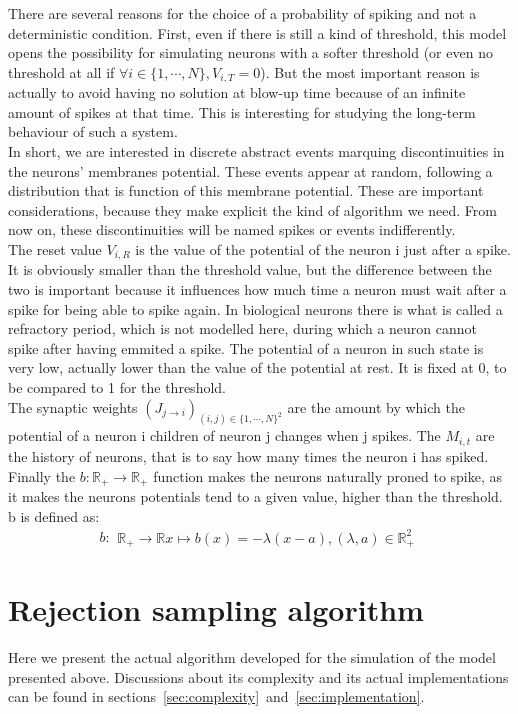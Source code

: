 \documentclass{article}
\begin{document}
		There are several reasons for the choice of a probability of spiking and not a deterministic condition. First, even if there is still a kind of threshold, this model opens the possibility for simulating neurons with a softer threshold (or even no threshold at all if $\forall i\in\{1,\cdots,N\}, V_{i,T}=0$). But the most important reason is actually to avoid having no solution at blow-up time because of an infinite amount of spikes at that time. This is interesting for studying the long-term behaviour of such a system.\\\indent
		In short, we are interested in discrete abstract events marquing discontinuities in the neurons' membranes potential. These events appear at random, following a distribution that is function of this membrane potential. These are important considerations, because they make explicit the kind of algorithm we need. From now on, these discontinuities will be named spikes or events indifferently.\\\indent
		The reset value $V_{i,R}$ is the value of the potential of the neuron i just after a spike. It is obviously smaller than the threshold value, but the difference between the two is important because it influences how much time a neuron must wait after a spike for being able to spike again. In biological neurons there is what is called a refractory period, which is not modelled here, during which a neuron cannot spike after having emmited a spike. The potential of a neuron in such state is very low, actually lower than the value of the potential at rest. It is fixed at 0, to be compared to 1 for the threshold.\\\indent
		The synaptic weights $(J_{j\to i})_{(i,j)\in\{1,\cdots,N\}^2}$ are the amount by which the potential of a neuron i children of neuron j changes when j spikes. The $M_{i,t}$ are the history of neurons, that is to say how many times the neuron i has spiked.\\\indent
		Finally the $b:\mathbb{R}_{+}\to\mathbb{R}_+$ function makes the neurons naturally proned to spike, as it makes the neurons potentials tend to a given value, higher than the threshold. b is defined as:
		\begin{equation*}
			b:	\begin{aligned}
					\mathbb{R}_+\to\mathbb{R}
					x\mapsto b(x)=-\lambda(x-a), (\lambda,a)\in\mathbb{R}_+^2
				\end{aligned}
		\end{equation*}
	\section{Rejection sampling algorithm}\label{sec:rejectionsampling}
		Here we present the actual algorithm developed for the simulation of the model presented above. Discussions about its complexity and its actual implementations can be found in sections~\ref{sec:complexity}~and~\ref{sec:implementation}.\\\indent
\end{document}
